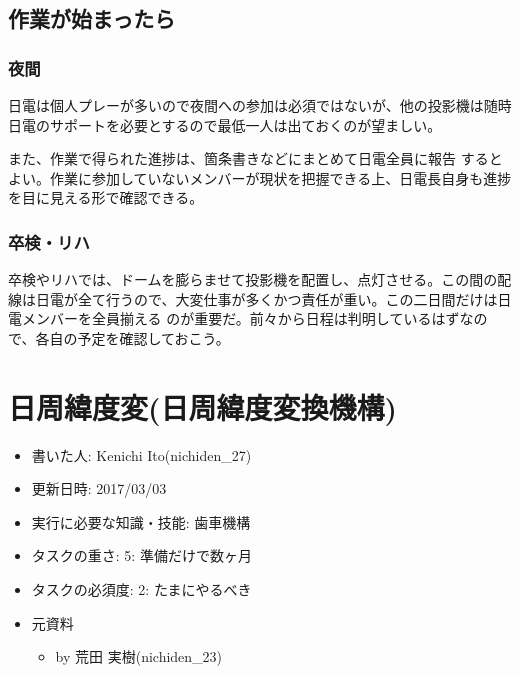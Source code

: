 \documentclass[letterpaper,10pt,dvipdfmx]{sphinxmanual}
\begin{document}
\section{作業が始まったら}
\label{\detokenize{management:}}\label{\detokenize{management:id8}}

\subsection{夜間}
\label{\detokenize{management:}}\label{\detokenize{management:id9}}
日電は個人プレーが多いので夜間への参加は必須ではないが、他の投影機は随時日電のサポートを必要とするので最低一人は出ておくのが望ましい。

また、作業で得られた進捗は、箇条書きなどにまとめて日電全員に報告 するとよい。作業に参加していないメンバーが現状を把握できる上、日電長自身も進捗を目に見える形で確認できる。


\subsection{卒検・リハ}
\label{\detokenize{management:}}\label{\detokenize{management:id10}}
卒検やリハでは、ドームを膨らませて投影機を配置し、点灯させる。この間の配線は日電が全て行うので、大変仕事が多くかつ責任が重い。この二日間だけは日電メンバーを全員揃える のが重要だ。前々から日程は判明しているはずなので、各自の予定を確認しておこう。


\chapter{日周緯度変(日周緯度変換機構)}
\label{\detokenize{nissyu-idohen/kikou:}}\label{\detokenize{nissyu-idohen/kikou::doc}}\label{\detokenize{nissyu-idohen/kikou:id1}}\begin{itemize}
\item {} 
書いた人: Kenichi Ito(nichiden\_27)

\item {} 
更新日時: 2017/03/03

\item {} 
実行に必要な知識・技能: 歯車機構

\item {} 
タスクの重さ: 5: 準備だけで数ヶ月

\item {} 
タスクの必須度: 2: たまにやるべき

\item {} 
元資料
\begin{itemize}
\item {} 
 by 荒田 実樹(nichiden\_23)

\end{itemize}

\end{itemize}
\end{document}
